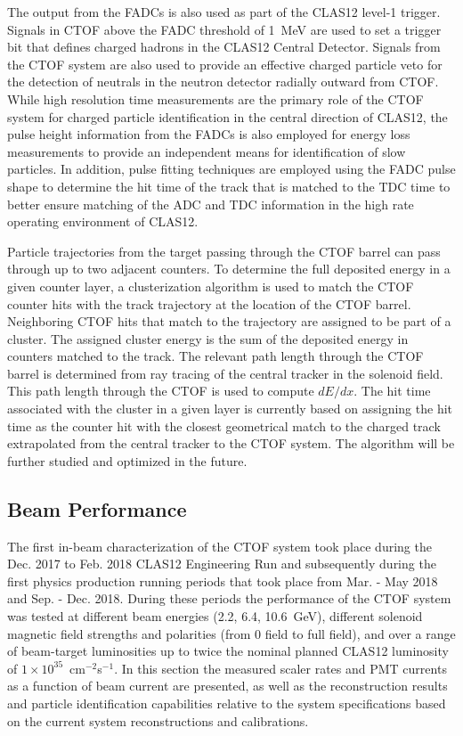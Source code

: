 \documentclass{elsart}
\begin{document}
The output from the FADCs is also used as part of the CLAS12 level-1 trigger. Signals in CTOF above
the FADC threshold of 1~MeV are used to set a trigger bit that defines charged hadrons in the
CLAS12 Central Detector. Signals from the CTOF system are also used to provide an effective charged
particle veto for the detection of neutrals in the neutron detector radially outward from CTOF. While high
resolution time measurements are the primary role of the CTOF system for charged particle identification
in the central direction of CLAS12, the pulse height information from the FADCs is also employed for energy
loss measurements to provide an independent means for identification of slow particles. In addition, pulse
fitting techniques are employed using the FADC pulse shape to determine the hit time of the track that is
matched to the TDC time to better ensure matching of the ADC and TDC information in the high rate
operating environment of CLAS12.

Particle trajectories from the target passing through the CTOF barrel can pass through up to two adjacent
counters. To determine the full deposited energy in a given counter layer, a clusterization algorithm is used
to match the CTOF counter hits with the track trajectory at the location of the CTOF barrel. Neighboring
CTOF hits that match to the trajectory are assigned to be part of a cluster. The assigned cluster energy is
the sum of the deposited energy in counters matched to the track. The relevant path length through
the CTOF barrel is determined from ray tracing of the central tracker in the solenoid field. This path
length through the CTOF is used to compute $dE/dx$. The hit time associated with the cluster in a given
layer is currently based on assigning the hit time as the counter hit with the closest geometrical match to the
charged track extrapolated from the central tracker to the CTOF system. The algorithm will be further
studied and optimized in the future.
  
\subsection{Beam Performance}  
\label{sec:beam}

The first in-beam characterization of the CTOF system took place during the Dec. 2017 to Feb. 2018
CLAS12 Engineering Run and subsequently during the first physics production running periods that
took place from Mar. - May 2018 and Sep. - Dec. 2018. During these periods the performance of the
CTOF system was tested at different beam energies (2.2, 6.4, 10.6~GeV), different solenoid magnetic
field strengths and polarities (from 0 field to full field), and over a range of beam-target luminosities
up to twice the nominal planned CLAS12 luminosity of $1 \times 10^{35}$~cm$^{-2}$s$^{-1}$. In this
section the measured scaler rates and PMT currents as a function of beam current are presented, as
well as the reconstruction results and particle identification capabilities relative to the system
specifications based on the current system reconstructions and calibrations.
\end{document}
